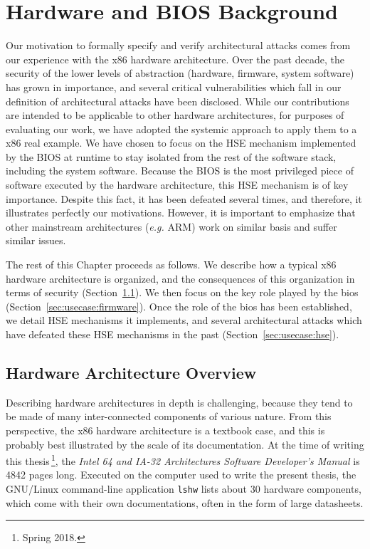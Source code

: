\chapter{Hardware and BIOS Background}
\label{chapter:usecase}

Our motivation to formally specify and verify architectural attacks comes from
our experience with the x86 hardware architecture.
%
Over the past decade, the security of the lower levels of abstraction (hardware,
firmware, system software) has grown in importance, and several critical
vulnerabilities which fall in our definition of architectural attacks have been
disclosed.
%
While our contributions are intended to be applicable to other hardware
architectures, for purposes of evaluating our work, we have adopted the systemic
approach to apply them to a x86 real example.
%
We have chosen to focus on the HSE mechanism implemented by the BIOS at runtime
to stay isolated from the rest of the software stack, including the system
software.
%
Because the BIOS is the most privileged piece of software executed by the
hardware architecture, this HSE mechanism is of key importance.
%
Despite this fact, it has been defeated several times, and therefore, it
illustrates perfectly our motivations.
%
However, it is important to emphasize that other mainstream architectures
(\emph{e.g.}  ARM) work on similar basis and suffer similar issues.

The rest of this Chapter proceeds as follows.
%
We describe how a typical x86 hardware architecture is organized, and the
consequences of this organization in terms of security
(Section~\ref{sec:usecase:architecture}).
%
We then focus on the key role played by the \ac{bios}
(Section~\ref{sec:usecase:firmware}).
%
Once the role of the \ac{bios} has been established, we detail HSE mechanisms it
implements, and several architectural attacks which have defeated these HSE
mechanisms in the past (Section~\ref{sec:usecase:hse}).

\section{Hardware Architecture Overview}
\label{sec:usecase:architecture}

Describing hardware architectures in depth is challenging, because they tend to
be made of many inter-connected components of various nature.
%
From this perspective, the x86 hardware architecture is a textbook case, and
this is probably best illustrated by the scale of its documentation.
%
At the time of writing this thesis\,\footnote{Spring 2018.}, the \emph{Intel 64
  and IA-32 Architectures Software Developer’s Manual} is 4842 pages long.
%
Executed on the computer used to write the present thesis, the GNU/Linux
command-line application \texttt{lshw} lists about 30 hardware components, which
come with their own documentations, often in the form of large datasheets.

